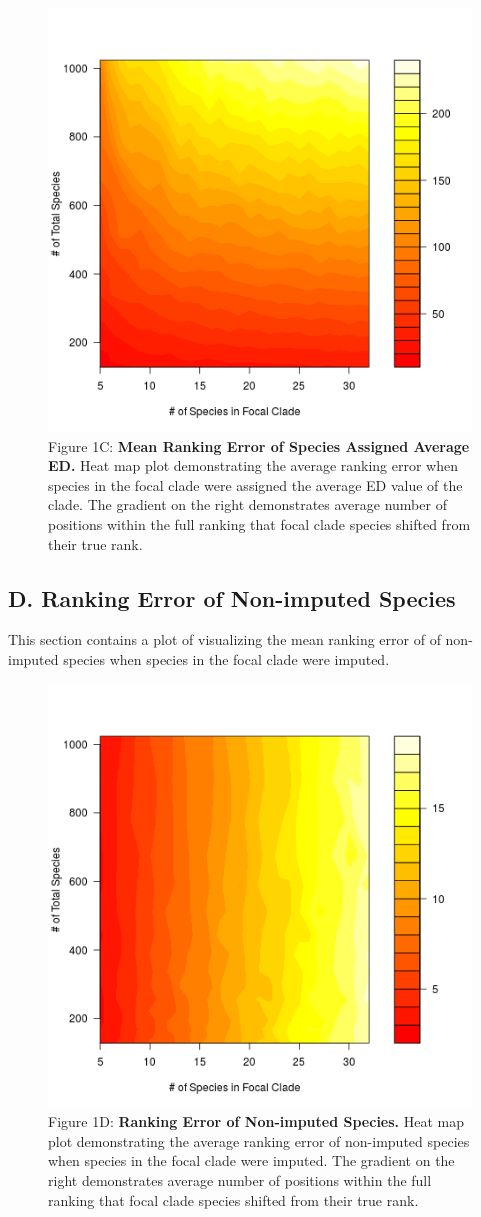 \documentclass[10pt,english]{article}
\begin{document}
\begin{figure}[!ht]
  \center
  \includegraphics[width=.5\textwidth]{rankingError_avgEDforClade.png}
  \caption*{Figure 1C: \textbf{Mean Ranking Error of Species Assigned Average ED.} Heat map
  plot demonstrating the average ranking error when species in the focal clade
  were assigned the average ED value of the clade. The gradient on the right
  demonstrates average number of positions within the full ranking that focal
  clade species shifted from their true rank.}
\end{figure}
\clearpage
\subsection*{D. Ranking Error of Non-imputed Species}

This section contains a plot of visualizing the mean ranking error of of
non-imputed species when species in the focal clade were imputed.

\begin{figure}[!ht]
  \center
  \includegraphics[width=.5\textwidth]{rankingError_remainingSpp.png}
  \caption*{Figure 1D: \textbf{Ranking Error of Non-imputed Species.} Heat map plot
  demonstrating the average ranking error of non-imputed species when species in
  the focal clade were imputed. The gradient on the right demonstrates average
  number of positions within the full ranking that focal clade species shifted
  from their true rank.}
\end{figure}
\end{document}
